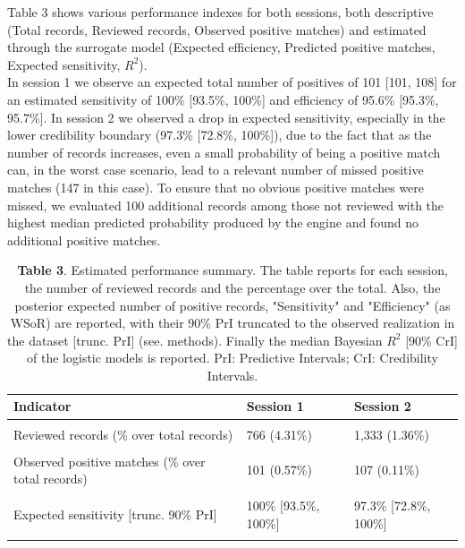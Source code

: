 \documentclass{article}
\begin{document}
Table 3 shows various performance indexes for both sessions, both
descriptive (Total records, Reviewed records, Observed positive matches)
and estimated through the surrogate model (Expected efficiency,
Predicted positive matches, Expected sensitivity, \(R^2\)).\\
In session 1 we observe an expected total number of positives of 101
{[}101, 108{]} for an estimated sensitivity of 100\% {[}93.5\%, 100\%{]}
and efficiency of 95.6\% {[}95.3\%, 95.7\%{]}. In session 2 we observed
a drop in expected sensitivity, especially in the lower credibility
boundary (97.3\% {[}72.8\%, 100\%{]}), due to the fact that as the
number of records increases, even a small probability of being a
positive match can, in the worst case scenario, lead to a relevant
number of missed positive matches (147 in this case). To ensure that no
obvious positive matches were missed, we evaluated 100 additional
records among those not reviewed with the highest median predicted
probability produced by the engine and found no additional positive
matches.\\

\begin{table}[!h]

\caption{\label{tab:Table 3}\textbf{Table 3}. Estimated performance summary. The table reports for each session, the number of reviewed records and the percentage over the total. Also, the posterior expected number of positive records, "Sensitivity" and "Efficiency" (as WSoR) are reported, with their 90\% PrI truncated to the observed realization in the dataset [trunc. PrI] (see. methods). Finally the median Bayesian $R^2$ [90\% CrI] of the logistic models is reported. PrI: Predictive Intervals; CrI: Credibility Intervals.}
\centering
\begin{tabular}[t]{lll}
\toprule
Indicator & Session 1 & Session 2\\
\midrule
\cellcolor{gray!6}{Total records} & \cellcolor{gray!6}{17,755} & \cellcolor{gray!6}{98,371}\\
Reviewed records (\% over total records) & 766 (4.31\%) & 1,333 (1.36\%)\\
\cellcolor{gray!6}{Expected efficiency (over random) [trunc. 90\% PrI]} & \cellcolor{gray!6}{95.6\% [95.3\%, 95.7\%]} & \cellcolor{gray!6}{98.6\% [98.1\%, 98.6\%]}\\
Observed positive matches (\% over total records) & 101 (0.57\%) & 107 (0.11\%)\\
\cellcolor{gray!6}{Predicted positive matches [trunc. 90\% PrI]} & \cellcolor{gray!6}{101 [101, 108]} & \cellcolor{gray!6}{110 [107, 147]}\\
\addlinespace
Expected sensitivity [trunc. 90\% PrI] & 100\% [93.5\%, 100\%] & 97.3\% [72.8\%, 100\%]\\
\cellcolor{gray!6}{Simple Model $R^2$ [90\% CrI]} & \cellcolor{gray!6}{98.1\% [97.4\%, 98.3\%]} & \cellcolor{gray!6}{98.2\% [97.6\%, 98.3\%]}\\
\bottomrule
\end{tabular}
\end{table}
\end{document}
